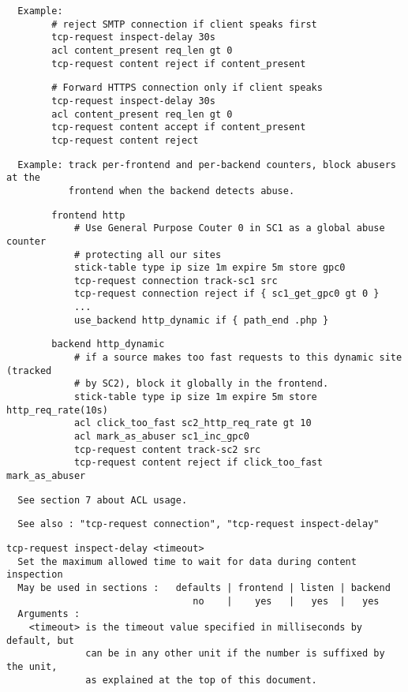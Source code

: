 \begin{verbatim}
  Example:
        # reject SMTP connection if client speaks first
        tcp-request inspect-delay 30s
        acl content_present req_len gt 0
        tcp-request content reject if content_present
\end{verbatim}

\begin{verbatim}
        # Forward HTTPS connection only if client speaks
        tcp-request inspect-delay 30s
        acl content_present req_len gt 0
        tcp-request content accept if content_present
        tcp-request content reject
\end{verbatim}

\begin{verbatim}
  Example: track per-frontend and per-backend counters, block abusers at the
           frontend when the backend detects abuse.
\end{verbatim}

\begin{verbatim}
        frontend http
            # Use General Purpose Couter 0 in SC1 as a global abuse counter
            # protecting all our sites
            stick-table type ip size 1m expire 5m store gpc0
            tcp-request connection track-sc1 src
            tcp-request connection reject if { sc1_get_gpc0 gt 0 }
            ...
            use_backend http_dynamic if { path_end .php }
\end{verbatim}

\begin{verbatim}
        backend http_dynamic
            # if a source makes too fast requests to this dynamic site (tracked
            # by SC2), block it globally in the frontend.
            stick-table type ip size 1m expire 5m store http_req_rate(10s)
            acl click_too_fast sc2_http_req_rate gt 10
            acl mark_as_abuser sc1_inc_gpc0
            tcp-request content track-sc2 src
            tcp-request content reject if click_too_fast mark_as_abuser
\end{verbatim}

\begin{verbatim}
  See section 7 about ACL usage.
\end{verbatim}

\begin{verbatim}
  See also : "tcp-request connection", "tcp-request inspect-delay"
\end{verbatim}

\begin{verbatim}
tcp-request inspect-delay <timeout>
  Set the maximum allowed time to wait for data during content inspection
  May be used in sections :   defaults | frontend | listen | backend
                                 no    |    yes   |   yes  |   yes
  Arguments :
    <timeout> is the timeout value specified in milliseconds by default, but
              can be in any other unit if the number is suffixed by the unit,
              as explained at the top of this document.
\end{verbatim}

